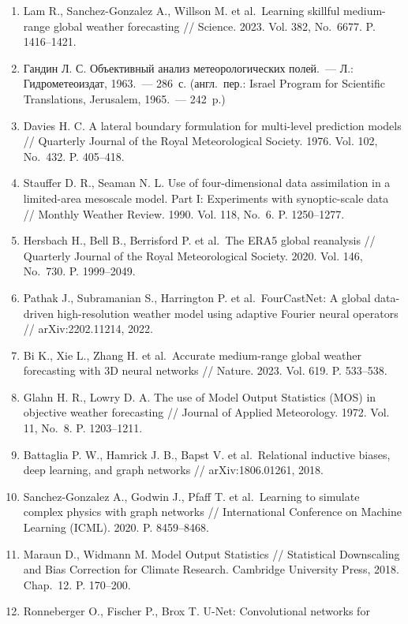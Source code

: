 \documentclass[14pt,a4paper]{extarticle}
\numberwithin{table}{section}
\numberwithin{figure}{section}
\numberwithin{equation}{section}
\begin{document}
\begin{enumerate}
\def\labelenumi{\arabic{enumi}.}
\item
  Lam R., Sanchez-Gonzalez A., Willson M. et al.~Learning skillful
  medium-range global weather forecasting // Science. 2023. Vol. 382,
  No.~6677. P. 1416--1421.
\item
  Гандин Л. С. Объективный анализ метеорологических полей.~--- Л.:
  Гидрометеоиздат, 1963.~--- 286~с. (англ.~пер.: Israel Program for
  Scientific Translations, Jerusalem, 1965.~--- 242~p.)
\item
  Davies H. C. A lateral boundary formulation for multi-level prediction
  models // Quarterly Journal of the Royal Meteorological Society. 1976.
  Vol. 102, No.~432. P. 405--418.
\item
  Stauffer D. R., Seaman N. L. Use of four-dimensional data assimilation
  in a limited-area mesoscale model. Part I: Experiments with
  synoptic-scale data // Monthly Weather Review. 1990. Vol. 118, No.~6.
  P. 1250--1277.
\item
  Hersbach H., Bell B., Berrisford P. et al.~The ERA5 global reanalysis
  // Quarterly Journal of the Royal Meteorological Society. 2020. Vol.
  146, No.~730. P. 1999--2049.
\item
  Pathak J., Subramanian S., Harrington P. et al.~FourCastNet: A global
  data-driven high-resolution weather model using adaptive Fourier
  neural operators // arXiv:2202.11214, 2022.
\item
  Bi K., Xie L., Zhang H. et al.~Accurate medium-range global weather
  forecasting with 3D neural networks // Nature. 2023. Vol. 619.
  P. 533--538.
\item
  Glahn H. R., Lowry D. A. The use of Model Output Statistics (MOS) in
  objective weather forecasting // Journal of Applied Meteorology. 1972.
  Vol. 11, No.~8. P. 1203--1211.
\item
  Battaglia P. W., Hamrick J. B., Bapst V. et al.~Relational inductive
  biases, deep learning, and graph networks // arXiv:1806.01261, 2018.
\item
  Sanchez-Gonzalez A., Godwin J., Pfaff T. et al.~Learning to simulate
  complex physics with graph networks // International Conference on
  Machine Learning (ICML). 2020. P. 8459--8468.
\item
  Maraun D., Widmann M. Model Output Statistics // Statistical
  Downscaling and Bias Correction for Climate Research. Cambridge
  University Press, 2018. Chap.~12. P. 170--200.
\item
  Ronneberger O., Fischer P., Brox T. U-Net: Convolutional networks for

\end{enumerate}
\end{document}
